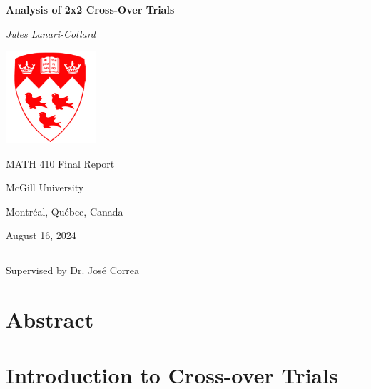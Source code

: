 \documentclass[12pt, TexShade, letterpaper]{report}
\author{\textcopyright Author, August, 2020}
\date{}
\renewcommand{\chaptermark}[1]{\markboth{#1}{}} %
\begin{document}
\begin{titlepage}
		\begin{center}
			\vspace*{0.5cm}

			\LARGE
			\textbf{Analysis of 2x2 Cross-Over Trials}
			
			\vspace{1cm}
			
			\textit{Jules Lanari-Collard}
			
			\vspace{1.2cm}
			
			\includegraphics[width=0.25\textwidth]{mcglogo.png}
			
			\Large
			MATH 410 Final Report
			
			\vspace{-5mm}
			McGill University
			
			\vspace{-5mm}
			Montr\'eal, Qu\'ebec, Canada
			
			\vspace{5mm}
			August 16, 2024
			\small
			\vspace{0.5cm}
			{\color{red} \hrule height 0.75mm}
			
			\vspace{0.2cm}
			
			Supervised by Dr. José Correa
		\end{center}
\end{titlepage}

\setlength{\voffset}{2cm}
\renewcommand{\chaptermark}[1]{%
	\markboth{\thechapter.\ #1}{}}
\chapter*{Abstract}
	\label{chap:engAbstract}

	\tableofcontents\thispagestyle{plain}

 	\clearpage

\chapter{Introduction to Cross-over Trials}
\end{document}
